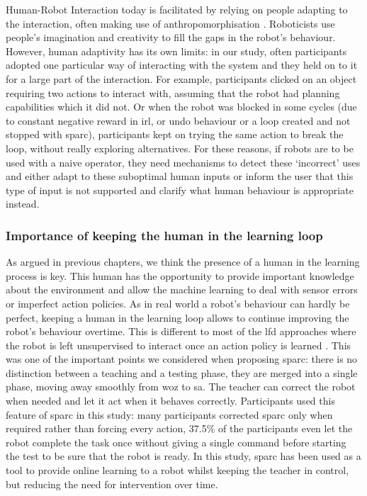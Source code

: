 Human-Robot Interaction today is facilitated by relying on people adapting to the interaction, often making use of anthropomorphisation \citep{zlotowski2015anthropomorphism}. Roboticists use people's imagination and creativity to fill the gaps in the robot's behaviour. However, human adaptivity has its own limits: in our study, often participants adopted one particular way of interacting with the system and they held on to it for a large part of the interaction. For example, participants clicked on an object requiring two actions to interact with, assuming that the robot had planning capabilities which it did not. Or when the robot was blocked in some cycles (due to constant negative reward in \gls{irl}, or undo behaviour or a loop created and not stopped with \gls{sparc}), participants kept on trying the same action to break the loop, without really exploring alternatives. For these reasons, if robots are to be used with a naive operator, they need mechanisms to detect these `incorrect' uses and either adapt to these suboptimal human inputs or inform the user that this type of input is not supported and clarify what human behaviour is appropriate instead.

\subsubsection{Importance of keeping the human in the learning loop}

As argued in previous chapters, we think the presence of a human in the learning process is key. This human has the opportunity to provide important knowledge about the environment and allow the machine learning to deal with sensor errors or imperfect action policies. As in real world a robot's behaviour can hardly be perfect, keeping a human in the learning loop allows to continue improving the robot's behaviour overtime. This is different to most of the \gls{lfd} approaches where the robot is left unsupervised to interact once an action policy is learned \citep{argall2009survey,sequeira2016discovering}. This was one of the important points we considered when proposing \gls{sparc}: there is no distinction between a teaching and a testing phase, they are merged into a single phase, moving away smoothly from \gls{woz} to \gls{sa}. The teacher can correct the robot when needed and let it act when it behaves correctly. Participants used this feature of \gls{sparc} in this study: many participants corrected \gls{sparc} only when required rather than forcing every action, 37.5\% of the participants even let the robot complete the task once without giving a single command before starting the test to be sure that the robot is ready. In this study, \gls{sparc} has been used as a tool to provide online learning to a robot whilst keeping the teacher in control, but reducing the need for intervention over time.


